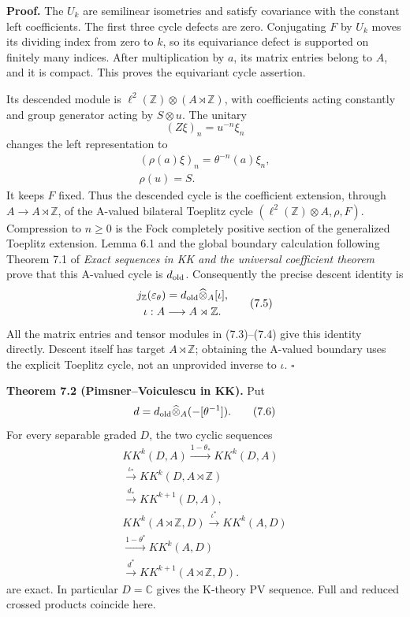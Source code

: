 \documentclass[
  11pt,
]{article}
\begin{document}
\textbf{Proof.} The \(U_k\) are semilinear isometries and satisfy
covariance with the constant left coefficients. The first three cycle
defects are zero. Conjugating \(F\) by \(U_k\) moves its dividing index
from zero to \(k\), so its equivariance defect is supported on finitely
many indices. After multiplication by \(a\), its matrix entries belong
to \(A\), and it is compact. This proves the equivariant cycle
assertion.

Its descended module is \(\ell^2(\mathbb Z)\otimes(A\rtimes\mathbb Z)\),
with coefficients acting constantly and group generator acting by
\(S\otimes u\). The unitary \[
(Z\xi)_n=u^{-n}\xi_n
\tag{7.3}
\] changes the left representation to \[
\begin{gathered}
(\rho(a)\xi)_n=\theta^{-n}(a)\xi_n,\\
\rho(u)=S.
\end{gathered}
\tag{7.4}
\] It keeps \(F\) fixed. Thus the descended cycle is the coefficient
extension, through \(A\to A\rtimes\mathbb Z\), of the A-valued bilateral
Toeplitz cycle \((\ell^2(\mathbb Z)\otimes A,\rho,F)\). Compression to
\(n\geq0\) is the Fock completely positive section of the generalized
Toeplitz extension. Lemma 6.1 and the global boundary calculation
following Theorem 7.1 of \emph{Exact sequences in KK and the universal
coefficient theorem} prove that this A-valued cycle is \(d_{\rm old}\).
Consequently the precise descent identity is \[
\begin{gathered}
j_{\mathbb Z}(\varepsilon_\theta)
 =d_{\rm old}\widehat\otimes_A[\iota],\\
\iota:A\longrightarrow A\rtimes\mathbb Z.
\end{gathered}
\tag{7.5}
\] All the matrix entries and tensor modules in (7.3)--(7.4) give this
identity directly. Descent itself has target \(A\rtimes\mathbb Z\);
obtaining the A-valued boundary uses the explicit Toeplitz cycle, not an
unprovided inverse to \(\iota\). \(\square\)

\textbf{Theorem 7.2 (Pimsner--Voiculescu in KK).} Put \[
d=d_{\rm old}\widehat\otimes_A(-[\theta^{-1}]).
\tag{7.6}
\] For every separable graded \(D\), the two cyclic sequences \[
\begin{gathered}
KK^k(D,A)\xrightarrow{1-\theta_*}KK^k(D,A)\\
 \xrightarrow{\iota_*}KK^k(D,A\rtimes\mathbb Z)\\
 \xrightarrow{d_*}KK^{k+1}(D,A),\\[2mm]
KK^k(A\rtimes\mathbb Z,D)\xrightarrow{\iota^*}KK^k(A,D)\\
 \xrightarrow{1-\theta^*}KK^k(A,D)\\
 \xrightarrow{d^*}KK^{k+1}(A\rtimes\mathbb Z,D).
\end{gathered}
\tag{7.7}
\] are exact. In particular \(D=\mathbb C\) gives the K-theory PV
sequence. Full and reduced crossed products coincide here.
\end{document}
